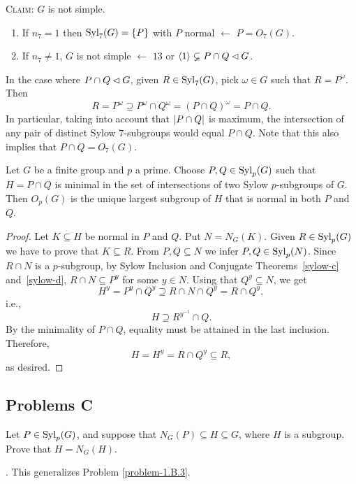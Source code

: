 \begin{xmpl}
\begin{enumerate}
    \end{enumerate}
    \textsc{Claim: }$G$ is not simple.
    \begin{enumerate}
        \item[$14$.] If\/ $n_7=1$ then\/ ${\rm Syl}_7(G)=\{P\}$ with $P$ normal $\leftarrow$ $P=O_7(G)$.
        \item[$15$.] If\/ $n_7\ne1$, $G$ is not simple $\leftarrow$ {\upshape $13$ or $\langle1\rangle\varsubsetneq P\cap Q\lhd G$}.
    \end{enumerate}
    In the case where $P\cap Q\lhd G$, given $R\in{\rm Syl}_7(G)$, pick $\omega\in G$ such that $R=P^\omega$. Then
    $$
        R=P^\omega\supseteq P^\omega\cap Q^\omega=(P\cap Q)^\omega=P\cap Q.
    $$
    In particular, taking into account that $\left\vert{P\cap Q}\right\vert$ is maximum, the intersection of any pair of distinct Sylow $7$-subgroups would equal $P\cap Q$. Note that this also implies that $P\cap Q=O_7(G)$.
\end{xmpl}

\begin{thm}
    Let $G$ be a finite group and $p$ a prime. Choose $P, Q \in {\rm Syl}_p(G)$ such that $H = P\cap Q$ is minimal in the set of intersections of two Sylow $p$-subgroups of\/ $G$. Then $O_p(G)$ is the unique largest subgroup of $H$ that is normal in both $P$ and $Q$.
\end{thm}

\begin{proof} Let $K\subseteq H$ be normal in $P$ and $Q$. Put $N=N_G(K)$. Given $R\in{\rm Syl}_p(G)$ we have to prove that $K\subseteq R$. From $P,Q\subseteq N$ we infer $P,Q\in{\rm Syl}_p(N)$. Since $R\cap N$ is a $p$-subgroup, by Sylow Inclusion and Conjugate Theorems~\ref{sylow-c} and~\ref{sylow-d}, $R\cap N\subseteq P^y$ for some $y\in N$. Using that $Q^y\subseteq N$, we get
$$
    H^y = P^y\cap Q^y \supseteq R\cap N\cap Q^y = R\cap Q^y,
$$
i.e.,
$$
    H \supseteq R^{y^{-1}}\cap Q.
$$
By the minimality of $P\cap Q$, equality must be attained in the last inclusion. Therefore,
$$
    H = H^y = R\cap Q^y \subseteq R,
$$
as desired.  \end{proof}



\subsection{Problems C}

\begin{probl}\label{problem-1.C.1}
    Let $P\in{\rm Syl}_p(G)$, and suppose that $N_G(P)\subseteq H \subseteq G$, where $H$ is a subgroup. Prove that $H = N_G(H)$.

    \textrm{. This generalizes Problem \ref{problem-1.B.3}}.
\end{probl}

